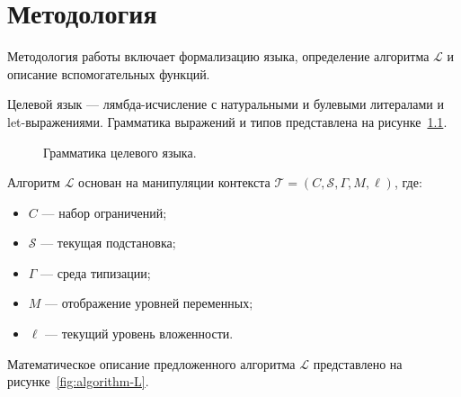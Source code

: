 \chapter{Методология}
\label{chap:met}

Методология работы включает формализацию языка, определение алгоритма $\mathcal{L}$ и описание вспомогательных функций.

Целевой язык — лямбда-исчисление с натуральными и булевыми литералами и let-выражениями. Грамматика выражений и типов представлена на рисунке~\ref{fig:object-language-grammar}.

\begin{figure}[H]
  \caption{Грамматика целевого языка.}
  \label{fig:object-language-grammar}
\end{figure}

Алгоритм $\mathcal{L}$ основан на манипуляции контекста $\mathcal{T} = (C,\mathcal{S},\Gamma,M,\ell)$, где:
\begin{itemize}
  \item $C$ — набор ограничений;
  \item $\mathcal{S}$ — текущая подстановка;
  \item $\Gamma$ — среда типизации;
  \item $M$ — отображение уровней переменных;
  \item $\ell$ — текущий уровень вложенности.
\end{itemize}

Математическое описание предложенного алгоритма $\mathcal{L}$ представлено на рисунке~\ref{fig:algorithm-L}.


